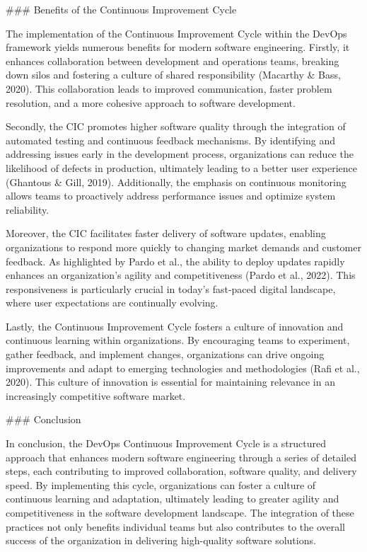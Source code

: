 ### Benefits of the Continuous Improvement Cycle

The implementation of the Continuous Improvement Cycle within the DevOps framework yields numerous benefits for modern software engineering. Firstly, it enhances collaboration between development and operations teams, breaking down silos and fostering a culture of shared responsibility (Macarthy & Bass, 2020). This collaboration leads to improved communication, faster problem resolution, and a more cohesive approach to software development.

Secondly, the CIC promotes higher software quality through the integration of automated testing and continuous feedback mechanisms. By identifying and addressing issues early in the development process, organizations can reduce the likelihood of defects in production, ultimately leading to a better user experience (Ghantous & Gill, 2019). Additionally, the emphasis on continuous monitoring allows teams to proactively address performance issues and optimize system reliability.

Moreover, the CIC facilitates faster delivery of software updates, enabling organizations to respond more quickly to changing market demands and customer feedback. As highlighted by Pardo et al., the ability to deploy updates rapidly enhances an organization’s agility and competitiveness (Pardo et al., 2022). This responsiveness is particularly crucial in today’s fast-paced digital landscape, where user expectations are continually evolving.

Lastly, the Continuous Improvement Cycle fosters a culture of innovation and continuous learning within organizations. By encouraging teams to experiment, gather feedback, and implement changes, organizations can drive ongoing improvements and adapt to emerging technologies and methodologies (Rafi et al., 2020). This culture of innovation is essential for maintaining relevance in an increasingly competitive software market.

### Conclusion

In conclusion, the DevOps Continuous Improvement Cycle is a structured approach that enhances modern software engineering through a series of detailed steps, each contributing to improved collaboration, software quality, and delivery speed. By implementing this cycle, organizations can foster a culture of continuous learning and adaptation, ultimately leading to greater agility and competitiveness in the software development landscape. The integration of these practices not only benefits individual teams but also contributes to the overall success of the organization in delivering high-quality software solutions.


